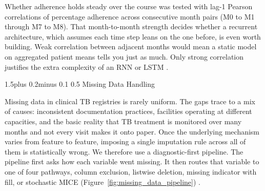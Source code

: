 \documentclass[12pt]{article}
\makeatletter
\renewcommand{\_}{\textunderscore\allowbreak}
\renewcommand{\subsection}{\@startsection{subsection}{2}{0pt}%
  {1.5\baselineskip plus 0.2\baselineskip minus 0.1\baselineskip}%
  {0.5\baselineskip}%
  {\bfseries\normalsize}}
\makeatother
\begin{document}
Whether adherence holds steady over the course was tested with lag-1 Pearson correlations of percentage adherence across consecutive month pairs (M0 to M1 through M7 to M8). That month-to-month strength decides whether a recurrent architecture, which assumes each time step leans on the one before, is even worth building. Weak correlation between adjacent months would mean a static model on aggregated patient means tells you just as much. Only strong correlation justifies the extra complexity of an RNN or LSTM \citep{ref10, ref12}.

\subsection{Missing Data Handling}

Missing data in clinical TB registries is rarely uniform. The gaps trace to a mix of causes: inconsistent documentation practices, facilities operating at different capacities, and the basic reality that TB treatment is monitored over many months and not every visit makes it onto paper. Once the underlying mechanism varies from feature to feature, imposing a single imputation rule across all of them is statistically wrong. We therefore use a diagnostic-first pipeline. The pipeline first asks how each variable went missing. It then routes that variable to one of four pathways, column exclusion, listwise deletion, missing indicator with fill, or stochastic MICE (Figure~\ref{fig:missing_data_pipeline}) \citep{ref31, ref32}.
\end{document}
